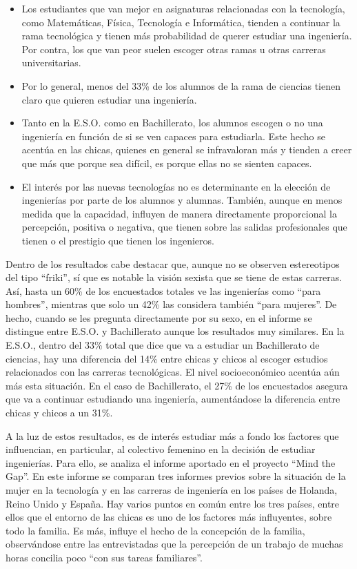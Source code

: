 \documentclass[runningheads,a4paper]{llncs}
\begin{document}
\begin{itemize}
  \item Los estudiantes que van mejor en asignaturas relacionadas con la tecnología, como Matemáticas, Física, Tecnología e Informática, tienden a continuar la rama tecnológica y tienen más probabilidad de querer estudiar una ingeniería. Por contra, los que van peor suelen escoger otras ramas u otras carreras universitarias.
  \item Por lo general, menos del 33\% de los alumnos de la rama de ciencias tienen claro que quieren estudiar una ingeniería.
  \item Tanto en la E.S.O. como en Bachillerato, los alumnos escogen o no una ingeniería en función de si se ven capaces para estudiarla. Este hecho se acentúa en las chicas, quienes en general se infravaloran más y tienden a creer que más que porque sea difícil, es porque ellas no se sienten capaces.
  \item El interés por las nuevas tecnologías no es determinante en la elección de ingenierías por parte de los alumnos y alumnas. También, aunque en menos medida que la capacidad, influyen de manera directamente proporcional la percepción, positiva o negativa, que tienen sobre las salidas profesionales que tienen o el prestigio que tienen los ingenieros.
\end{itemize}

Dentro de los resultados cabe destacar que, aunque no se observen estereotipos del tipo ``friki'', sí que es notable la visión sexista que se tiene de estas carreras. Así, hasta un 60\% de los encuestados totales ve las ingenierías como ``para hombres'', mientras que solo un 42\% las considera también ``para mujeres''. De hecho, cuando se les pregunta directamente por su sexo, en el informe se distingue entre E.S.O. y Bachillerato aunque los resultados muy similares. En la E.S.O., dentro del 33\% total que dice que va a estudiar un Bachillerato de ciencias, hay una diferencia del 14\% entre chicas y chicos al escoger estudios relacionados con las carreras tecnológicas. El nivel socioeconómico acentúa aún más esta situación. En el caso de Bachillerato, el 27\% de los encuestados asegura que va a continuar estudiando una ingeniería, aumentándose la diferencia entre chicas y chicos a un 31\%.

A la luz de estos resultados, es de interés estudiar más a fondo los factores que influencian, en particular, al colectivo femenino en la decisión de estudiar ingenierías. Para ello, se analiza el informe aportado en el proyecto ``Mind the Gap''. En este informe \cite{mtg2015} se comparan tres informes previos sobre la situación de la mujer en la tecnología y en las carreras de ingeniería en los países de Holanda, Reino Unido y España.
Hay varios puntos en común entre los tres países, entre ellos que el entorno de las chicas es uno de los factores más influyentes, sobre todo la familia. Es más, influye el hecho de la concepción de la familia, observándose entre las entrevistadas que la percepción de un trabajo de muchas horas concilia poco ``con sus tareas familiares''.
\end{document}
